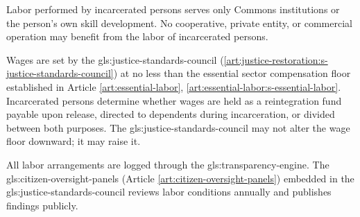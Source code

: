 Labor performed by incarcerated persons serves only Commons institutions or the person's own skill development. No cooperative, private entity, or commercial operation may benefit from the labor of incarcerated persons.

Wages are set by the \gls{gls:justice-standards-council} (\ref{art:justice-restoration:s-justice-standards-council}) at no less than the essential sector compensation floor established in Article \ref{art:essential-labor}, \ref{art:essential-labor:s-essential-labor}. Incarcerated persons determine whether wages are held as a reintegration fund payable upon release, directed to dependents during incarceration, or divided between both purposes. The \gls{gls:justice-standards-council} may not alter the wage floor downward; it may raise it.

All labor arrangements are logged through the \gls{gls:transparency-engine}. The \gls{gls:citizen-oversight-panels} (Article \ref{art:citizen-oversight-panels}) embedded in the \gls{gls:justice-standards-council} reviews labor conditions annually and publishes findings publicly.